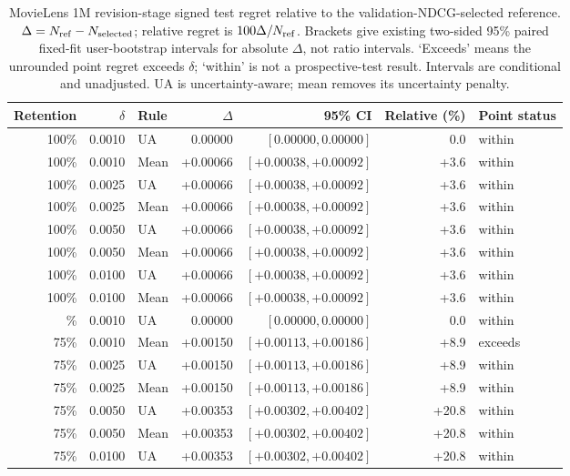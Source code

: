 \begin{table}[H]
\centering
\caption{MovieLens 1M revision-stage signed test regret relative to the validation-NDCG-selected reference. $\Delta=N_{\rm ref}-N_{\rm selected}$; relative regret is $100\Delta/N_{\rm ref}$. Brackets give existing two-sided 95\% paired fixed-fit user-bootstrap intervals for absolute $\Delta$, not ratio intervals. `Exceeds' means the unrounded point regret exceeds $\delta$; `within' is not a prospective-test result. Intervals are conditional and unadjusted. UA is uncertainty-aware; mean removes its uncertainty penalty.}
\label{tab:coverage-regret-movielens-1m}
\small
\setlength{\tabcolsep}{4pt}
\begin{tabular}{@{}rrlrrrl@{}}
\toprule
Retention & $\delta$ & Rule & $\Delta$ & 95\% CI & Relative (\%) & Point status \\
\midrule
100\% & 0.0010 & UA & 0.00000 & $[0.00000, 0.00000]$ & 0.0 & within \\
100\% & 0.0010 & Mean & +0.00066 & $[+0.00038, +0.00092]$ & +3.6 & within \\
100\% & 0.0025 & UA & +0.00066 & $[+0.00038, +0.00092]$ & +3.6 & within \\
100\% & 0.0025 & Mean & +0.00066 & $[+0.00038, +0.00092]$ & +3.6 & within \\
100\% & 0.0050 & UA & +0.00066 & $[+0.00038, +0.00092]$ & +3.6 & within \\
100\% & 0.0050 & Mean & +0.00066 & $[+0.00038, +0.00092]$ & +3.6 & within \\
100\% & 0.0100 & UA & +0.00066 & $[+0.00038, +0.00092]$ & +3.6 & within \\
100\% & 0.0100 & Mean & +0.00066 & $[+0.00038, +0.00092]$ & +3.6 & within \\
\addlinespace
75\% & 0.0010 & UA & 0.00000 & $[0.00000, 0.00000]$ & 0.0 & within \\
75\% & 0.0010 & Mean & +0.00150 & $[+0.00113, +0.00186]$ & +8.9 & exceeds \\
75\% & 0.0025 & UA & +0.00150 & $[+0.00113, +0.00186]$ & +8.9 & within \\
75\% & 0.0025 & Mean & +0.00150 & $[+0.00113, +0.00186]$ & +8.9 & within \\
75\% & 0.0050 & UA & +0.00353 & $[+0.00302, +0.00402]$ & +20.8 & within \\
75\% & 0.0050 & Mean & +0.00353 & $[+0.00302, +0.00402]$ & +20.8 & within \\
75\% & 0.0100 & UA & +0.00353 & $[+0.00302, +0.00402]$ & +20.8 & within \\

\end{tabular}
\end{table}
